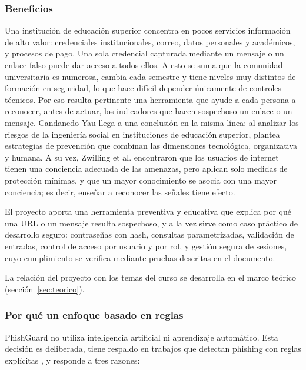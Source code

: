 \documentclass[journal,onecolumn,12pt,draftclsnofoot]{IEEEtran}
\begin{document}
\subsubsection{Beneficios}

Una institución de educación superior concentra en pocos servicios información de alto valor: credenciales institucionales, correo, datos personales y académicos, y procesos de pago. Una sola credencial capturada mediante un mensaje o un enlace falso puede dar acceso a todos ellos. A esto se suma que la comunidad universitaria es numerosa, cambia cada semestre y tiene niveles muy distintos de formación en seguridad, lo que hace difícil depender únicamente de controles técnicos. Por eso resulta pertinente una herramienta que ayude a cada persona a reconocer, antes de actuar, los indicadores que hacen sospechoso un enlace o un mensaje. Candanedo-Yau \cite{candanedo} llega a una conclusión en la misma línea: al analizar los riesgos de la ingeniería social en instituciones de educación superior, plantea estrategias de prevención que combinan las dimensiones tecnológica, organizativa y humana. A su vez, Zwilling et al. \cite{zwilling} encontraron que los usuarios de internet tienen una conciencia adecuada de las amenazas, pero aplican solo medidas de protección mínimas, y que un mayor conocimiento se asocia con una mayor conciencia; es decir, enseñar a reconocer las señales tiene efecto.

El proyecto aporta una herramienta preventiva y educativa que explica por qué una URL o un mensaje resulta sospechoso, y a la vez sirve como caso práctico de desarrollo seguro: contraseñas con hash, consultas parametrizadas, validación de entradas, control de acceso por usuario y por rol, y gestión segura de sesiones, cuyo cumplimiento se verifica mediante pruebas descritas en el documento.

La relación del proyecto con los temas del curso se desarrolla en el marco teórico (sección~\ref{sec:teorico}).

\subsubsection{Por qué un enfoque basado en reglas}

PhishGuard no utiliza inteligencia artificial ni aprendizaje automático. Esta decisión es deliberada, tiene respaldo en trabajos que detectan phishing con reglas explícitas \cite{jeeva}, \cite{moghimi} y responde a tres razones:
\end{document}
